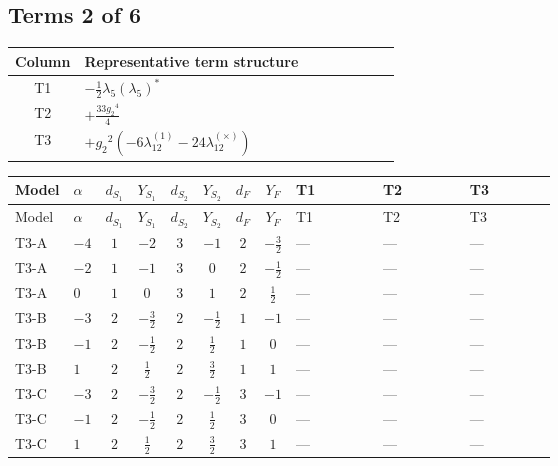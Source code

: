 \documentclass[8pt]{article}
\begin{document}
\begin{landscape}
\subsection*{Terms 2 of 6}
\begin{center}
\begin{tabular}{@{}c >{\raggedright\arraybackslash}p{0.82\linewidth}@{}}
\toprule
Column & Representative term structure \\
\midrule
T1 & \(\displaystyle -\frac{1}{2} {\lambda_5} \left({\lambda_5}\right)^{*}\) \\
\midrule
T2 & \(\displaystyle +\frac{33 {g_2}^4}{4}\) \\
\midrule
T3 & \(\displaystyle +{g_2}^2 (-6 {\lambda_{12}^{(1)}}-24 {\lambda_{12}^{(\times)}})\) \\
\midrule
\bottomrule
\end{tabular}
\end{center}
\smallskip
\tiny
\begin{longtable}{@{}llcccccc >{\raggedright\arraybackslash}p{0.21\linewidth} >{\raggedright\arraybackslash}p{0.21\linewidth} >{\raggedright\arraybackslash}p{0.21\linewidth}@{}}
\toprule
Model & $\alpha$ & $d_{S_1}$ & $Y_{S_1}$ & $d_{S_2}$ & $Y_{S_2}$ & $d_F$ & $Y_F$ & T1 & T2 & T3 \\
\midrule
\endfirsthead
\toprule
Model & $\alpha$ & $d_{S_1}$ & $Y_{S_1}$ & $d_{S_2}$ & $Y_{S_2}$ & $d_F$ & $Y_F$ & T1 & T2 & T3 \\
\midrule
\endhead
T3-A & $-4$ & $1$ & $-2$ & $3$ & $-1$ & $2$ & $-\frac{3}{2}$ & --- & --- & --- \\
\midrule
T3-A & $-2$ & $1$ & $-1$ & $3$ & $0$ & $2$ & $-\frac{1}{2}$ & --- & --- & --- \\
\midrule
T3-A & $0$ & $1$ & $0$ & $3$ & $1$ & $2$ & $\frac{1}{2}$ & --- & --- & --- \\
\midrule
T3-B & $-3$ & $2$ & $-\frac{3}{2}$ & $2$ & $-\frac{1}{2}$ & $1$ & $-1$ & --- & --- & --- \\
\midrule
T3-B & $-1$ & $2$ & $-\frac{1}{2}$ & $2$ & $\frac{1}{2}$ & $1$ & $0$ & --- & --- & --- \\
\midrule
T3-B & $1$ & $2$ & $\frac{1}{2}$ & $2$ & $\frac{3}{2}$ & $1$ & $1$ & --- & --- & --- \\
\midrule
T3-C & $-3$ & $2$ & $-\frac{3}{2}$ & $2$ & $-\frac{1}{2}$ & $3$ & $-1$ & --- & --- & --- \\
\midrule
T3-C & $-1$ & $2$ & $-\frac{1}{2}$ & $2$ & $\frac{1}{2}$ & $3$ & $0$ & --- & --- & --- \\
\midrule
T3-C & $1$ & $2$ & $\frac{1}{2}$ & $2$ & $\frac{3}{2}$ & $3$ & $1$ & --- & --- & --- \\

\end{longtable}
\end{landscape}
\end{document}
